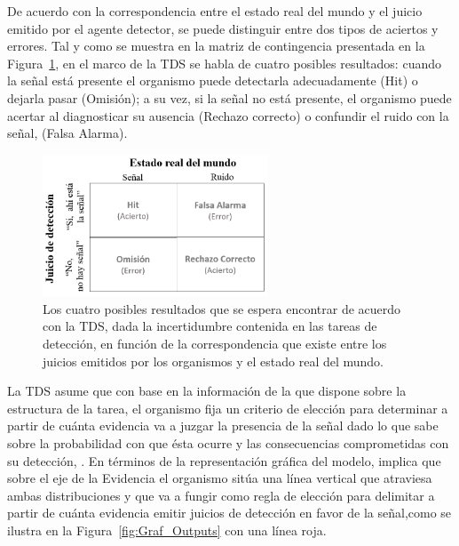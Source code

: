 De acuerdo con la correspondencia entre el estado real del mundo y el juicio emitido por el agente detector, se puede distinguir entre dos tipos de aciertos y errores. Tal y como se muestra en la matriz de contingencia presentada en la Figura~\ref{fig:Mat_Output}, en el marco de la TDS se habla de cuatro posibles resultados: cuando la señal está presente el organismo puede detectarla adecuadamente (Hit) o dejarla pasar (Omisión); a su vez, si la señal no está presente, el organismo puede acertar al diagnosticar su ausencia (Rechazo correcto) o confundir el ruido con la señal, (Falsa Alarma).\\

\begin{figure}[th]
\centering
\includegraphics[width=0.60\textwidth]{Figures/Matriz_Outputs} 
\caption[Posibles Resultados en una Tarea de Detección]{Los cuatro posibles resultados que se espera encontrar de acuerdo con la TDS, dada la incertidumbre contenida en las tareas de detección, en función de la correspondencia que existe entre los juicios emitidos por los organismos y el estado real del mundo.}
\label{fig:Mat_Output}
\end{figure}

La TDS asume que con base en la información de la que dispone sobre la estructura de la tarea, el organismo fija un criterio de elección para determinar a partir de cuánta evidencia va a juzgar la presencia de la señal dado lo que sabe sobre la probabilidad con que ésta ocurre y las consecuencias comprometidas con su detección, \parencite{Tanner1954, Swets1961, Nevin1969}. En términos de la representación gráfica del modelo, implica que sobre el eje de la Evidencia el organismo sitúa una línea vertical que atraviesa ambas distribuciones y que va a fungir como regla de elección para delimitar a partir de cuánta evidencia  emitir juicios de detección en favor de la señal,como se ilustra en la Figura~\ref{fig:Graf_Outputs} con una línea roja.\\

